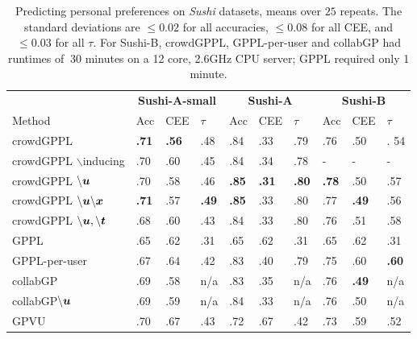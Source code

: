\begin{table}
 \centering
 \small
 \setlength{\tabcolsep}{4pt}
 \begin{tabular}{l l l l@{\hskip 0.5cm} l l l@{\hskip 0.5cm} l l l}
\toprule
& \multicolumn{3}{c}{\textbf{Sushi-A-small}} & \multicolumn{3}{c}{\textbf{Sushi-A}} & \multicolumn{3}{c}{\textbf{Sushi-B}} \\ 
Method & Acc & CEE & $\tau$ & Acc & CEE & $\tau$ & Acc & CEE & $\tau$ \\
\midrule
crowdGPPL & \textbf{.71} & \textbf{.56} & .48 
& .84 & .33 & .79
& .76 & .50 & . 54
 \\
crowdGPPL $\backslash $inducing & .70 & .60 & .45 
& .84 & .34 & .78 
& - & - & - 
\\
crowdGPPL $\backslash  \boldsymbol u$ & .70 & .58 & .46 & 
\textbf{.85} & \textbf{.31} & \textbf{.80} 
& \textbf{.78} & .50 & .57 
\\
crowdGPPL $\backslash  \boldsymbol u \backslash  \boldsymbol x$ & \textbf{.71} & .57 & \textbf{.49} &
\textbf{.85} & .33 & .80 
& .77 & \textbf{.49} & .56 
\\
crowdGPPL $\backslash \boldsymbol u,\backslash \boldsymbol t$ 
& .68 & .60 & .43 
& .84 & .33 & .80
& .76 & .51 & .58
\\ 
\midrule 
GPPL & .65 & .62 & .31
& .65 & .62 & .31
& .65 & .62 & .31
\\
GPPL-per-user & .67 & .64 & .42
& .83 & .40 & .79 
& .75 & .60 & \textbf{.60} 
\\
collabGP & .69 & .58 & n/a 
& .83 & .35 & n/a
& .76 & \textbf{.49} & n/a
\\
collabGP$\backslash  \boldsymbol u$ & .69 & .59 & n/a & .84 & .33 & n/a & .76 & .50 & n/a
\\
GPVU & .70 & .67 & .43 & .72 & .67 & .42 & .73 & .59 & .52
\\ \bottomrule
\end{tabular}
\caption{Predicting personal preferences on \emph{Sushi} datasets,
means over $25$ repeats. 
The standard deviations are $\leq 0.02$ for all accuracies, 
$\leq 0.08$ for all CEE, 
and $\leq 0.03$ for all $\tau$.
For Sushi-B, crowdGPPL, GPPL-per-user and collabGP had runtimes of $~30$ minutes on a 12 core, 2.6GHz CPU server; GPPL required only 1 minute.
 }
\label{tab:sushi}
\end{table}
